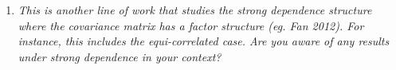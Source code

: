 \documentclass[11pt]{article}
\def\P{{\mathbb P}}
\begin{document}
\begin{enumerate}
%  
%  
%   
   
   
    \item {\em This is another line of work that studies the strong dependence structure where the covariance matrix has a factor structure (eg. Fan 2012). For instance, this includes the equi-correlated case. Are you aware of any results under strong dependence in your context?}
    

\end{enumerate}
\end{document}
